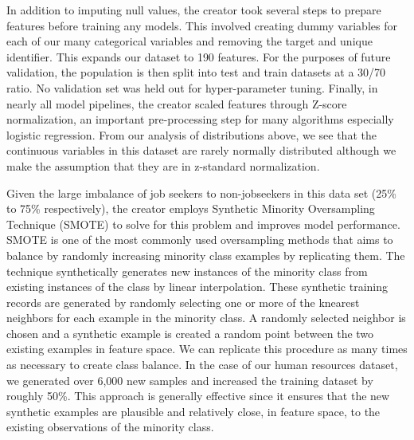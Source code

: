 In addition to imputing null values, the creator took several steps to prepare features before training any models.  This involved creating dummy variables for each of our many categorical variables and removing the target and unique identifier.  This expands our dataset to 190 features. For the purposes of future validation, the population is then split into test and train datasets at a 30/70 ratio.  No validation set was held out for hyper-parameter tuning.  Finally, in nearly all model pipelines, the creator scaled features through Z-score normalization, an important pre-processing step for many algorithms especially logistic regression.  From our analysis of distributions above, we see that the continuous variables in this dataset are rarely normally distributed although we make the assumption that they are in z-standard normalization.

Given the large imbalance of job seekers to non-jobseekers in this data set (25\% to 75\% respectively), the creator employs Synthetic Minority Oversampling Technique (SMOTE) to solve for this problem and improves model performance.  SMOTE is one of the most commonly used oversampling methods that aims to balance by randomly increasing minority class examples by replicating them. The technique synthetically generates new instances of the minority class from existing instances of the class by linear interpolation.  These synthetic training records are generated by randomly selecting one or more of the k\-nearest neighbors for each example in the minority class.  A randomly selected neighbor is chosen and a synthetic example is created a random point between the two existing examples in feature space.  We can replicate this procedure as many times as necessary to create class balance.  In the case of our human resources dataset, we generated over 6,000 new samples and increased the training dataset by roughly 50\%.
This approach is generally effective since it ensures that the new synthetic examples are plausible and relatively close, in feature space, to the existing observations of the minority class.  

